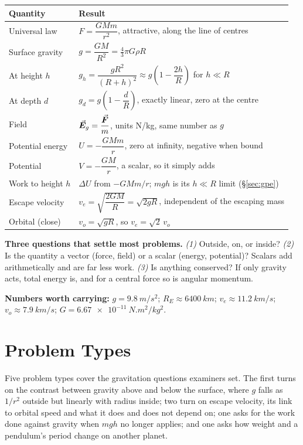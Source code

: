 \medskip
{\small\renewcommand{\arraystretch}{1.45}
\begin{center}
\begin{tabular}{@{}ll@{}}
\toprule
Quantity & Result\\
\midrule
Universal law        & $F=\dfrac{GMm}{r^{2}}$, attractive, along the line of centres\\[4pt]
Surface gravity      & $g=\dfrac{GM}{R^{2}}=\tfrac{4}{3}\pi G\rho R$\\[4pt]
At height $h$        & $g_h=\dfrac{gR^{2}}{(R+h)^{2}}\approx g\!\left(1-\dfrac{2h}{R}\right)$ for $h\ll R$\\[4pt]
At depth $d$         & $g_d=g\!\left(1-\dfrac{d}{R}\right)$, exactly linear, zero at the centre\\[4pt]
Field                & $\vec{\bm{E}}_g=\dfrac{\vec{\bm{F}}}{m}$, units \si{N/kg}, same number as $g$\\[4pt]
Potential energy     & $U=-\dfrac{GMm}{r}$, zero at infinity, negative when bound\\[4pt]
Potential            & $V=-\dfrac{GM}{r}$, a scalar, so it simply adds\\[4pt]
Work to height $h$   & $\Delta U$ from $-GMm/r$; $mgh$ is its $h\ll R$ limit (\S\ref{sec:gpe})\\[4pt]
Escape velocity      & $v_e=\sqrt{\dfrac{2GM}{R}}=\sqrt{2gR}$, independent of the escaping mass\\[4pt]
Orbital (close)      & $v_o=\sqrt{gR}$, so $v_e=\sqrt2\,v_o$\\
\bottomrule
\end{tabular}
\end{center}
}

\medskip
\textbf{Three questions that settle most problems.}
\emph{(1)} Outside, on, or inside? \emph{(2)} Is the quantity a vector (force, field) or a scalar
(energy, potential)? Scalars add arithmetically and are far less work.
\emph{(3)} Is anything conserved? If only gravity acts, total energy is, and for a central force so is
angular momentum.

\medskip
\textbf{Numbers worth carrying:} $g=\SI{9.8}{m/s^2}$; $R_E\approx\SI{6400}{km}$;
$v_e\approx\SI{11.2}{km/s}$; $v_o\approx\SI{7.9}{km/s}$; $G=\SI{6.67e-11}{N.m^2/kg^2}$.

\section{Problem Types}\label{sec:types16}
Five problem types cover the gravitation questions examiners set. The first turns on the contrast between
gravity above and below the surface, where $g$ falls as $1/r^2$ outside but linearly with radius inside;
two turn on escape velocity, its link to orbital speed and what it does and does not depend on; one asks
for the work done against gravity when $mgh$ no longer applies; and one asks how weight and a pendulum's
period change on another planet.

